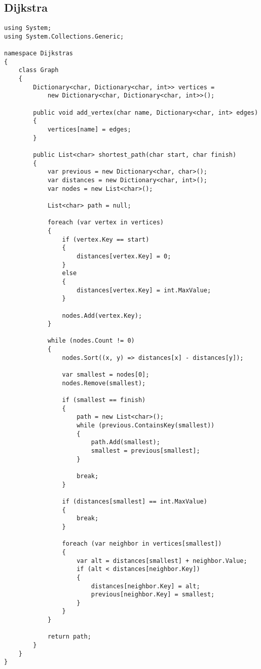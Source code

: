 \subsection{Dijkstra \cite{Algorithm3}}
\begin{lstlisting}
using System;
using System.Collections.Generic;

namespace Dijkstras
{
    class Graph
    {
        Dictionary<char, Dictionary<char, int>> vertices =
            new Dictionary<char, Dictionary<char, int>>();

        public void add_vertex(char name, Dictionary<char, int> edges)
        {
            vertices[name] = edges;
        }

        public List<char> shortest_path(char start, char finish)
        {
            var previous = new Dictionary<char, char>();
            var distances = new Dictionary<char, int>();
            var nodes = new List<char>();

            List<char> path = null;

            foreach (var vertex in vertices)
            {
                if (vertex.Key == start)
                {
                    distances[vertex.Key] = 0;
                }
                else
                {
                    distances[vertex.Key] = int.MaxValue;
                }

                nodes.Add(vertex.Key);
            }

            while (nodes.Count != 0)
            {
                nodes.Sort((x, y) => distances[x] - distances[y]);

                var smallest = nodes[0];
                nodes.Remove(smallest);

                if (smallest == finish)
                {
                    path = new List<char>();
                    while (previous.ContainsKey(smallest))
                    {
                        path.Add(smallest);
                        smallest = previous[smallest];
                    }

                    break;
                }

                if (distances[smallest] == int.MaxValue)
                {
                    break;
                }

                foreach (var neighbor in vertices[smallest])
                {
                    var alt = distances[smallest] + neighbor.Value;
                    if (alt < distances[neighbor.Key])
                    {
                        distances[neighbor.Key] = alt;
                        previous[neighbor.Key] = smallest;
                    }
                }
            }

            return path;
        }
    }
}
\end{lstlisting}